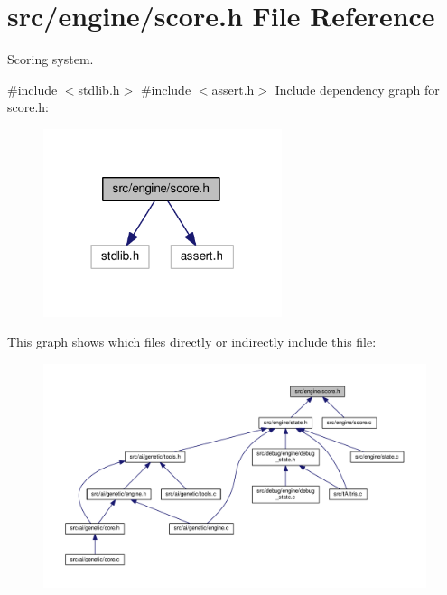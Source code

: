 \section{src/engine/score.h File Reference}
\label{score_8h}


Scoring system.  


{\ttfamily \#include $<$stdlib.\+h$>$}\newline
{\ttfamily \#include $<$assert.\+h$>$}\newline
Include dependency graph for score.\+h\+:
\nopagebreak
\begin{figure}[H]
\begin{center}
\leavevmode
\includegraphics[width=198pt]{score_8h__incl}
\end{center}
\end{figure}
This graph shows which files directly or indirectly include this file\+:
\nopagebreak
\begin{figure}[H]
\begin{center}
\leavevmode
\includegraphics[width=350pt]{score_8h__dep__incl}
\end{center}
\end{figure}
